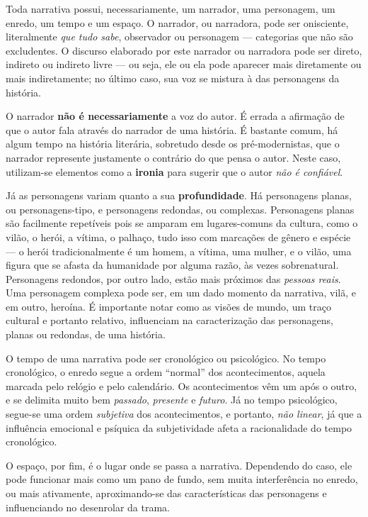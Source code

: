 \documentclass[11pt]{extarticle}
\begin{document}
Toda narrativa possui, necessariamente, um narrador, uma personagem, um enredo,
um tempo e um espaço. O narrador, ou narradora, pode ser onisciente, literalmente
\textit{que tudo sabe}, observador ou personagem --- categorias que não são excludentes.
O discurso elaborado por este narrador ou narradora pode ser direto, indireto ou indireto livre 
--- ou seja, ele ou ela pode aparecer mais diretamente ou mais indiretamente; no último caso,
sua voz se mistura à das personagens da história.

O narrador \textbf{não é necessariamente} a voz do autor. É errada a afirmação
de que o autor fala através do narrador de uma história. É bastante comum,
há algum tempo na história literária, sobretudo desde os pré-modernistas, que 
o narrador represente justamente o contrário do que pensa o autor. Neste caso, 
utilizam-se elementos como a \textbf{ironia} para sugerir que o autor \textit{não é confiável}.

Já as personagens variam quanto a sua \textbf{profundidade}. Há personagens planas, ou
personagens-tipo, e personagens redondas, ou complexas. Personagens planas
são facilmente repetíveis pois se amparam em lugares-comuns da cultura, como
o vilão, o herói, a vítima, o palhaço, tudo isso com marcações de gênero e espécie ---
o herói tradicionalmente é um homem, a vítima, uma mulher, e o vilão, uma figura que 
se afasta da humanidade por alguma razão, às vezes sobrenatural. 
Personagens redondos, por outro lado, estão mais próximos das \textit{pessoas reais}.
Uma personagem complexa pode ser, em um dado momento da narrativa, vilã, e em 
outro, heroína. É importante notar como as visões de mundo, um traço cultural e 
portanto relativo, influenciam na caracterização das personagens, planas 
ou redondas, de uma história.

O tempo de uma narrativa pode ser cronológico ou psicológico.
No tempo cronológico, o enredo segue a ordem ``normal'' dos acontecimentos,
aquela marcada pelo relógio e pelo calendário. Os acontecimentos vêm um após o 
outro, e se delimita muito bem \textit{passado}, \textit{presente} e \textit{futuro}.
Já no tempo psicológico, segue-se uma ordem \textit{subjetiva} dos acontecimentos, 
e portanto, \textit{não linear}, já que a influência emocional e psíquica 
da subjetividade afeta a racionalidade do tempo cronológico. 

O espaço, por fim, é o lugar onde se passa a narrativa. Dependendo do caso, 
ele pode funcionar mais como um pano de fundo, sem muita interferência
no enredo, ou mais ativamente, aproximando-se das características das personagens
e influenciando no desenrolar da trama. 
\end{document}
